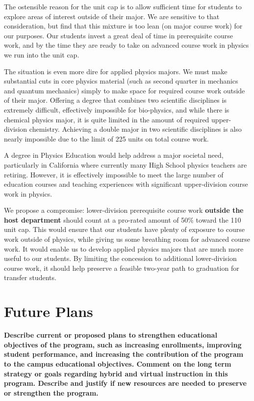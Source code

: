 \documentclass[12pt]{article}
\begin{document}
The ostensible reason for the unit cap is to allow sufficient time for
students to explore areas of interest outside of their major.  We are
sensitive to that consideration, but find that this mixture is too
lean (on major course work) for our purposes.  Our students invest a
great deal of time in prerequisite course work, and by the time they
are ready to take on advanced course work in physics we run into the
unit cap.

The situation is even more dire for applied physics majors.  We must
make substantial cuts in core physics material (such as second quarter
in mechanics and quantum mechanics) simply to make space for required
course work outside of their major.  Offering a degree that combines
two scientific disciplines is extremely difficult, effectively
impossible for bio-physics, and while there is chemical physics major,
it is quite limited in the amount of required upper-division chemistry.
Achieving a double major in two scientific disciplines is also nearly
impossible due to the limit of 225 units on total course work.

A degree in Physics Education would help address a major societal
need, particularly in California where currently many High School
physics teachers are retiring.  However, it is effectively impossible
to meet the large number of education courses and teaching experiences
with significant upper-division course work in physics.


We propose a compromise: lower-division prerequisite course work {\bf
  outside the host department} should count at a pro-rated amount of
50\% toward the 110 unit cap.  This would ensure that our students
have plenty of exposure to course work outside of physics, while
giving us some breathing room for advanced course work.  It would
enable us to develop applied physics majors that are much more useful
to our students.  By limiting the concession to additional
lower-division course work, it should help preserve a feasible
two-year path to graduation for transfer students.

\newpage
\section{Future Plans}
\label{sec:future}
{\bf Describe current or proposed plans to strengthen educational
  objectives of the program, such as increasing enrollments, improving
  student performance, and increasing the contribution of the program
  to the campus educational objectives. Comment on the long term
  strategy or goals regarding hybrid and virtual instruction in this
  program. Describe and justify if new resources are needed to
  preserve or strengthen the program.}
\end{document}
